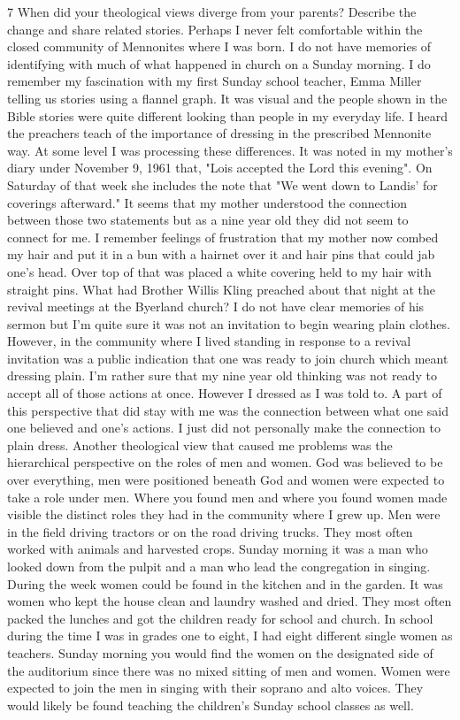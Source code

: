 7 When did your theological views diverge from your parents? Describe the change and share related stories.
Perhaps I never felt comfortable within the closed community of Mennonites where I was born. I do not have memories of identifying with much of what happened in church on a Sunday morning. I do remember my fascination with my first Sunday school teacher, Emma Miller telling us stories using a flannel graph. It was visual and the people shown in the Bible stories were quite different looking than people in my everyday life. I heard the preachers teach of the importance of dressing in the prescribed Mennonite way. At some level I was processing these differences.
It was noted in my mother's diary under November 9, 1961 that, "Lois accepted the Lord this evening". On Saturday of that week she includes the note that "We went down to Landis' for coverings afterward." It seems that my mother understood the connection between those two statements but as a nine year old they did not seem to connect for me. I remember feelings of frustration that my mother now combed my hair and put it in a bun with a hairnet over it and hair pins that could jab one's head. Over top of that was placed a white covering held to my hair with straight pins. What had Brother Willis Kling preached about that night at the revival meetings at the Byerland church? I do not have clear memories of his sermon but I'm quite sure it was not an invitation to begin wearing plain clothes. However, in the community where I lived standing in response to a revival invitation was a public indication that one was ready to join church which meant dressing plain. I'm rather sure that my nine year old thinking was not ready to accept all of those actions at once. However I dressed as I was told to. A part of this perspective that did stay with me was the connection between what one said one believed and one's actions. I just did not personally make the connection to plain dress.
Another theological view that caused me problems was the hierarchical perspective on the roles of men and women. God was believed to be over everything, men were positioned beneath God and women were expected to take a role under men. Where you found men and where you found women made visible the distinct roles they had in the community where I grew up. Men were in the field driving tractors or on the road driving trucks. They most often worked with animals and harvested crops. Sunday morning it was a man who looked down from the pulpit and a man who lead the congregation in singing. During the week women could be found in the kitchen and in the garden. It was women who kept the house clean and laundry washed and dried. They most often packed the lunches and got the children ready for school and church. In school during the time I was in grades one to eight, I had eight different single women as teachers. Sunday morning you would find the women on the designated side of the auditorium since there was no mixed sitting of men and women. Women were expected to join the men in singing with their soprano and alto voices. They would likely be found teaching the children's Sunday school classes as well. 

